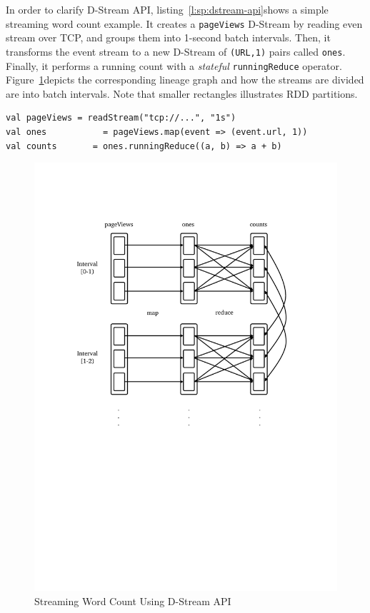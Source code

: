 In order to clarify D-Stream API, listing~\ref{l:sp:dstream-api}\footnotemark shows a simple streaming word count example. It creates a \lstinline$pageViews$ D-Stream by
reading even stream over TCP, and groups them into 1-second batch intervals. Then, it transforms the event stream to a new D-Stream of \lstinline$(URL,1)$ pairs called
\lstinline$ones$. Finally, it performs a running count with a \emph{stateful} \lstinline$runningReduce$ operator. Figure~\ref{fig:sp:dstream-api}\footnotemark[\value{footnote}] depicts the corresponding lineage graph and how the streams are divided are into batch intervals. Note that smaller rectangles illustrates RDD partitions.
\begin{lstlisting}[float=h, caption={Streaming Word Count using D-Stream API},label={l:sp:dstream-api},captionpos=b,morekeywords={val}]
val pageViews = readStream("tcp://...", "1s")
val ones           = pageViews.map(event => (event.url, 1))
val counts       = ones.runningReduce((a, b) => a + b)
\end{lstlisting}
\begin{figure}[h]
    \centering
    \includegraphics[clip,trim=2.5cm 11cm 3cm 4cm]{dstream-example.pdf}
    \caption{Streaming Word Count Using D-Stream API}
    \label{fig:sp:dstream-api}
\end{figure}

